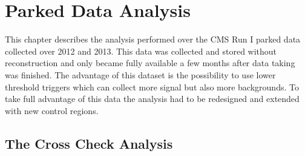 \chapter{Parked Data Analysis}
\label{CHAPTER:ParkedDataAnalysis}

\glsresetall %

This chapter describes the analysis performed over the \gls{CMS} Run I parked data collected over 2012 and 2013. This data was collected and stored without reconstruction and only became fully available a few months after data taking was finished. The advantage of this dataset is the possibility to use lower threshold triggers which can collect more signal but also more backgrounds. To take full advantage of this data the analysis had to be redesigned and extended with new control regions.

% 
% 

\section{The Cross Check Analysis}
\label{CHAPTER:ParkedDataAnalysis_CrossCheckAnalysis}

